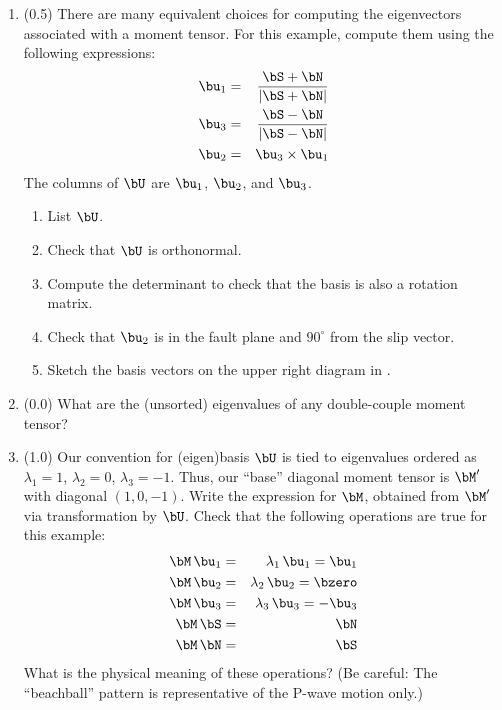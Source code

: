 \documentclass[11pt,titlepage,fleqn]{article}
\begin{document}
\begin{enumerate}
\item (0.5) There are many equivalent choices for computing the eigenvectors associated with a moment tensor. For this example, compute them using the following expressions:
%
\begin{eqnarray*}
\bu_1 &=& \frac{\bS + \bN}{\left| \bS + \bN \right|}
\\
\bu_3 &=& \frac{\bS - \bN}{\left| \bS - \bN \right|}
\\
\bu_2 &=& \bu_3  \times \bu_1
\end{eqnarray*}
%
The columns of $\bU$ are $\bu_1$, $\bu_2$, and $\bu_3$.
%
\begin{enumerate}
\item List $\bU$.
\item Check that $\bU$ is orthonormal.
\item Compute the determinant to check that the basis is also a rotation matrix.
\item Check that $\bu_2$ is in the fault plane and $90^\circ$ from the slip vector.
\item Sketch the basis vectors on the upper right diagram in .
\end{enumerate}


\item (0.0) What are the (unsorted) eigenvalues of any double-couple moment tensor?


\item (1.0) Our convention for (eigen)basis $\bU$ is tied to eigenvalues ordered as $\lambda_1 = 1$, $\lambda_2 = 0$, $\lambda_3 = -1$. Thus, our ``base'' diagonal moment tensor is $\bM'$ with diagonal $(1, 0, -1)$. Write the expression for $\bM$, obtained from $\bM'$ via transformation by $\bU$. Check that the following operations are true for this example:
%
\begin{eqnarray*}
\bM \, \bu_1 &=& \lambda_1 \, \bu_1 = \bu_1
\\
\bM \, \bu_2 &=& \lambda_2 \, \bu_2 = \bzero
\\
\bM \, \bu_3 &=& \lambda_3 \, \bu_3 = -\bu_3
\\
\bM \, \bS &=& \bN
\\
\bM \, \bN &=& \bS
\end{eqnarray*}
%
What is the physical meaning of these operations? (Be careful: The ``beachball'' pattern is representative of the P-wave motion only.)



\end{enumerate}
\end{document}
